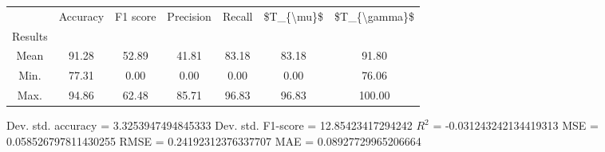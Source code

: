 \begin{tabular}{|c|c|c|c|c|c|c|}
\toprule
{} &  Accuracy &  F1 score &  Precision &  Recall &  \$T\_\{\textbackslash mu\}\$ &  \$T\_\{\textbackslash gamma\}\$ \\
Results &           &           &            &         &            &               \\
\hline
Mean    &     91.28 &     52.89 &      41.81 &   83.18 &      83.18 &         91.80 \\
Min.    &     77.31 &      0.00 &       0.00 &    0.00 &       0.00 &         76.06 \\
Max.    &     94.86 &     62.48 &      85.71 &   96.83 &      96.83 &        100.00 \\
\bottomrule
\end{tabular}

 Dev. std. accuracy = 3.3253947494845333
 Dev. std. F1-score = 12.85423417294242
 $R^2$ = -0.031243242134419313
 MSE = 0.058526797811430255
 RMSE = 0.24192312376337707
 MAE = 0.08927729965206664